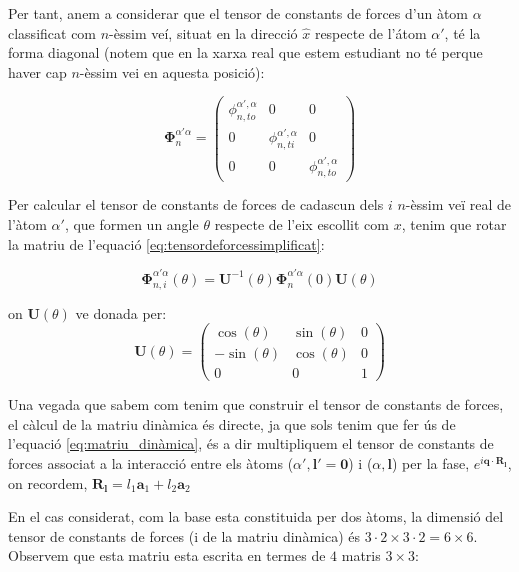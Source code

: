\documentclass[12pt]{article} %
\let\vec\mathbf %
\begin{document}
{Per tant, anem a considerar que el tensor de constants de forces  d'un àtom $\alpha$ classificat com $n$-èssim veí, situat en la direcció $\hat x$ respecte de l'átom  $\alpha'$, té la forma diagonal (notem que en la xarxa real que estem estudiant no té perque haver cap $n$-èssim vei en aquesta posició):

\begin{equation}
\vec\Phi_n^{\alpha'\alpha}=\begin{pmatrix}
\phi_{n,to}^{\alpha',\alpha}&0 &0\\
0& \phi_{n,ti}^{\alpha',\alpha} & 0 \\
0 & 0 & \phi_{n,to}^{\alpha',\alpha}
\end{pmatrix}
\label{eq:tensordeforcessimplificat}
\end{equation}

Per calcular el tensor de constants de forces de cadascun dels $i$ $n$-èssim veï real de l'àtom $\alpha'$, que formen un angle $\theta$ respecte de l'eix escollit com $x$, tenim que rotar la matriu de l'equació \ref{eq:tensordeforcessimplificat}:

\begin{equation}
 \vec\Phi_{n,i}^{\alpha'\alpha}(\theta)=\vec U^{-1}(\theta)\vec\Phi_n^{\alpha'\alpha}(0)\vec U(\theta)
\end{equation}


on $\vec U(\theta)$ ve donada per:
\begin{equation}
\vec U(\theta)=
\begin{pmatrix}
\cos(\theta)  & \sin(\theta) & 0 \\
-\sin(\theta) & \cos(\theta) & 0  \\
0             & 0            & 1
\end{pmatrix}
\end{equation}


Una vegada que sabem com tenim que construir el tensor de constants de forces, el càlcul de la matriu dinàmica és directe, ja que sols tenim que fer ús de l'equació \ref{eq:matriu_dinàmica}, és a dir multipliquem el tensor de constants de forces associat a la interacció entre els àtoms ($\alpha', \vec l'=\vec 0$) i ($\alpha,\vec l$) per la fase, $e^{i \vec q\cdot \vec R_\vec l}$, on recordem, $\vec R_\vec l=l_1 \vec a_1+ l_2 \vec a_2$

En el cas considerat, com la base esta constituida per dos àtoms, la dimensió del tensor de constants de forces (i de la matriu dinàmica) és $3\cdot 2\times 3\cdot 2= 6\times 6$. Observem que esta matriu esta escrita en termes de $4$ matris $3\times 3$:

}
\end{document}
